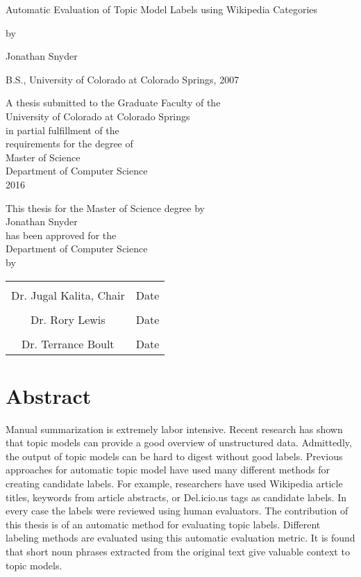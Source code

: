 \documentclass[12pt, letterpaper, oneside, openright]{book}
\newenvironment{abstract}%
{\vfill\begin{center}%
\bfseries \chapter{Abstract} \end{center}}%
	{\vfill\null}
\begin{document}
\frontmatter
\begin{titlepage}
	\null{}
	\centering
	{\huge Automatic Evaluation of Topic Model Labels using Wikipedia Categories\par}
	by\par
	Jonathan Snyder\par
	B.S., University of Colorado at Colorado Springs, 2007\par
	\null{}
	A thesis submitted to the Graduate Faculty of the \\
	University of Colorado at Colorado Springs \\
	in partial fulfillment of the \\
	requirements for the degree of \\
	Master of Science \\
	Department of Computer Science \\
	2016
	\null{}
\end{titlepage}
\begin{center}
	\null{}
	This thesis for the Master of Science degree by\\
	Jonathan Snyder\\
	has been approved for the\\
	Department of Computer Science\\
	by\\
	\null{}
	\noindent\begin{tabular}{cc}
	\makebox[2in]{\hrulefill} & \makebox[1in]{\hrulefill}\\
	Dr. Jugal Kalita, Chair & Date\\[8ex]
	\makebox[2in]{\hrulefill} & \makebox[1in]{\hrulefill}\\
	Dr. Rory Lewis & Date\\[8ex]
	\makebox[2in]{\hrulefill} & \makebox[1in]{\hrulefill}\\
	Dr. Terrance Boult & Date\\
	\end{tabular}
	\null{}
\end{center}
\begin{abstract}
Manual summarization is extremely labor intensive. Recent research has shown that topic models can provide a good overview of unstructured data.  Admittedly, the output of topic models can be hard to digest without good labels.  Previous approaches for automatic topic model have used many different methods for creating candidate labels.  For example, researchers have used Wikipedia article titles, keywords from article abstracts, or Del.icio.us tags as candidate labels.  In every case the labels were reviewed using human evaluators.  The contribution of this thesis is of an automatic method for evaluating topic labels.  Different labeling methods are evaluated using this automatic evaluation metric.  It is found that short noun phrases extracted from the original text give valuable context to topic models.
\end{abstract}
\end{document}
